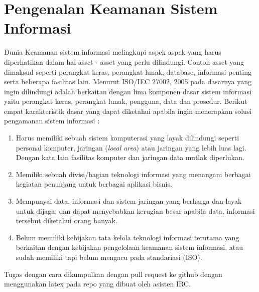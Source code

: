 \chapter{Pengenalan Keamanan Sistem Informasi}
Dunia Keamanan sistem informasi melingkupi aspek aspek yang harus diperhatikan dalam hal asset - asset yang perlu dilindungi. Contoh asset yang dimaksud seperti perangkat keras, perangkat lunak, database, informasi penting serta beberapa fasilitas lain.
Menurut ISO/IEC 27002, 2005 pada dasarnya yang ingin dilindungi adalah berkaitan dengan lima komponen dasar sistem informasi yaitu perangkat keras, perangkat lunak, pengguna, data dan prosedur. Berikut empat karakteristik dasar yang dapat diketahui apabila ingin menerapkan solusi pengamanan sistem informasi :
\begin{enumerate}
\item
Harus memiliki sebuah sistem komputerasi yang layak dilindungi seperti personal komputer, jaringan  (\textit{local area}) atau jaringan yang lebih luas lagi. Dengan kata lain fasilitas komputer dan jaringan data mutlak diperlukan. 
\item
Memiliki sebuah divisi/bagian teknologi informasi yang menangani berbagai kegiatan penunjang untuk berbagai aplikasi bisnis.
\item
Mempunyai data, informasi dan sistem jaringan yang berharga dan layak untuk dijaga, dan dapat menyebabkan kerugian besar apabila data, informasi tersebut diketahui orang banyak.
\item
Belum memiliki kebijakan tata kelola teknologi informasi terutama yang berkaitan dengan kebijakan pengelolaan keamanan sistem informasi, atau sudah memiliki tapi belum mengacu pada standariasi (ISO).
\end{enumerate}
Tugas dengan cara dikumpulkan dengan pull request ke github dengan menggunakan latex pada repo yang dibuat oleh asisten IRC.

